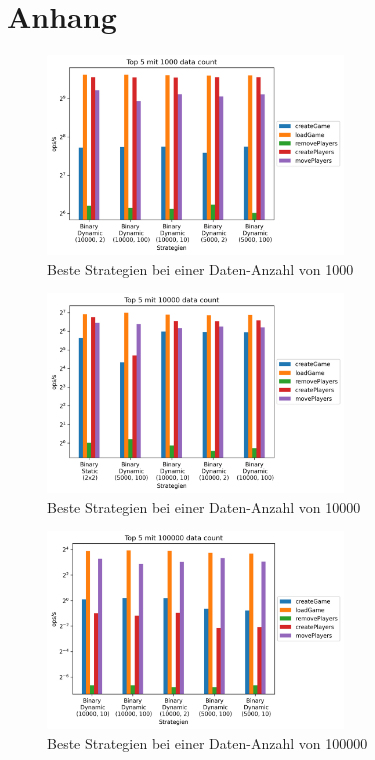 \chapter{Anhang}\label{ch:appendix}

\begin{figure}[htp]
    \centering
    \includegraphics[width=0.7\textwidth]{images/plots/1000.png}
    \caption{Beste Strategien bei einer Daten-Anzahl von 1000}
    \label{fig:smallDataCount}
\end{figure}

\begin{figure}[htp]
    \centering
    \includegraphics[width=0.7\textwidth]{images/plots/10000.png}
    \caption{Beste Strategien bei einer Daten-Anzahl von 10000}
    \label{fig:middleDataCount}
\end{figure}

\begin{figure}[htp]
    \centering
    \includegraphics[width=0.7\textwidth]{images/plots/100000.png}
    \caption{Beste Strategien bei einer Daten-Anzahl von 100000}
    \label{fig:bigDataCount}
\end{figure}


